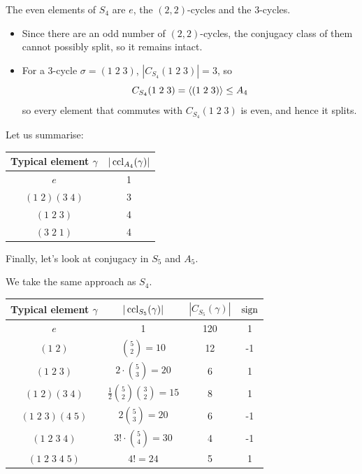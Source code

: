 \documentclass{../../template/note}
\begin{document}
    \begin{example}[\(A_4\)]
        The even elements of \(S_4\) are \(e\), the \((2, 2)\)-cycles and the 3-cycles.
        \begin{itemize}
            \item Since there are an odd number of \((2, 2)\)-cycles, the conjugacy class of them cannot possibly split, so it remains intact.
            \item For a 3-cycle \(\sigma = (1 \; 2 \; 3)\), \(|C_{S_4}(1 \; 2 \; 3)| = 3\), so
            \[
                C_{S_4}(1 \; 2 \; 3) = \left \langle (1 \; 2 \; 3) \right \rangle \leq A_4
            \]
            so every element that commutes with \(C_{S_4}(1 \; 2 \; 3)\) is even, and hence it splits.
        \end{itemize}
        Let us summarise:
        \begin{center}
            \begin{tabular}{c | c}
                Typical element \(\gamma\) & \(|\operatorname{ccl}_{A_4}(\gamma)|\) \\
                \hline
                \(e\) & 1 \\
                \((1 \; 2)(3 \; 4)\) & 3 \\
                \((1 \; 2 \; 3)\) & 4 \\
                \((3 \; 2 \; 1)\) & 4 \\
            \end{tabular}
        \end{center}
    \end{example}

    
    Finally, let's look at conjugacy in \(S_5\) and \(A_5\).

    \begin{example}[Conjugacy in \(S_5\)]
        We take the same approach as \(S_4\).
        \begin{center}
            \begin{tabular}{c | c | c | c}
                Typical element \(\gamma\) & \(|\operatorname{ccl}_{S_5}(\gamma)|\) & \(|C_{S_5}(\gamma)|\) & \(\operatorname{sign}\) \\
                \hline
                \(e\) & 1 & 120 & 1 \\
                \((1 \; 2)\) & \(\binom 5 2 = 10\) & 12 & -1 \\
                \((1 \; 2 \; 3)\) & \(2 \cdot \binom 5 3 = 20\) & 6 & 1 \\
                \((1 \; 2)(3 \; 4)\) & \(\frac 1 2 \binom 5 2 \binom 3 2 = 15\) & 8 & 1 \\
                \((1 \; 2 \; 3)(4 \; 5)\) & \(2 \binom 5 3 = 20\) & 6 & -1 \\
                \((1 \; 2 \; 3 \; 4)\) & \(3! \cdot \binom 5 4 = 30\) & 4 & -1 \\
                \((1 \; 2 \; 3 \; 4 \; 5)\) & \(4! = 24\) & 5 & 1 \\
            \end{tabular}
        \end{center}
    \end{example}
    
\end{document}
